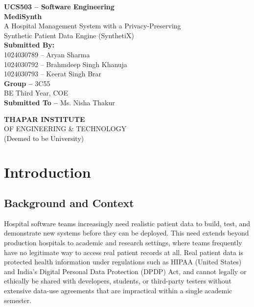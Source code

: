 \documentclass[12pt,a4paper]{report}
\begin{document}
\begin{titlepage}
    \centering
    \vspace*{1cm}

    {\Large \textbf{UCS503 -- Software Engineering}}\\[0.3cm]
    {\Large \textbf{MediSynth}}\\[0.3cm]
    {\large A Hospital Management System with a Privacy-Preserving\\
    Synthetic Patient Data Engine (SynthetiX)}\\[2cm]

    {\large \textbf{Submitted By:}}\\[0.5cm]

    1024030789 -- Aryan Sharma\\[0.3cm]
    1024030792 -- Brahmdeep Singh Khanuja\\[0.3cm]
    1024030793 -- Keerat Singh Brar\\[1cm]

    \textbf{Group --} 3C55\\[0.3cm]
    BE Third Year, COE\\[0.3cm]
    \textbf{Submitted To -- } Ms. Nisha Thakur\\[2cm]

    \vfill

    {\large \textbf{THAPAR INSTITUTE}}\\
    {\normalsize OF ENGINEERING \& TECHNOLOGY}\\
    {\small (Deemed to be University)}

    \vspace*{1cm}
\end{titlepage}

\tableofcontents

\chapter{Introduction}

\section{Background and Context}

Hospital software teams increasingly need realistic patient data to build, test, and demonstrate new systems before they can be deployed. This need extends beyond production hospitals to academic and research settings, where teams frequently have no legitimate way to access real patient records at all. Real patient data is protected health information under regulations such as HIPAA (United States) and India's Digital Personal Data Protection (DPDP) Act, and cannot legally or ethically be shared with developers, students, or third-party testers without extensive data-use agreements that are impractical within a single academic semester.
\end{document}
